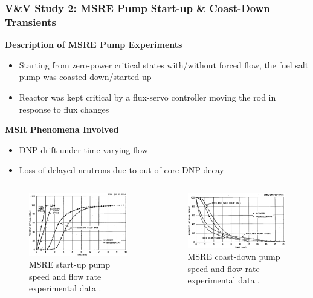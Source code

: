\begin{frame}
  \frametitle{V\&V Study 2: MSRE Pump Start-up \& Coast-Down Transients}
  \textbf{Description of MSRE Pump Experiments}
  \begin{itemize}
    \item Starting from zero-power critical states with/without forced flow, the fuel salt pump
  was coasted down/started up
    \item Reactor was kept critical by a flux-servo controller moving the rod in response to flux
      changes
  \end{itemize}
  \begin{block}{\textbf{MSR Phenomena Involved}}
    \begin{itemize}
      \item DNP drift under time-varying flow
      \item Loss of delayed neutrons due to out-of-core DNP decay
    \end{itemize}
  \end{block}
  \begin{columns}
    \column{5.5cm}
    \begin{figure}
      \centering
      \includegraphics[width=.8\columnwidth]{images/msre-startup}
      \caption{MSRE start-up pump speed and flow rate experimental data
      \cite{prince_zero-power_1968}.}
    \end{figure}
    \column{5.5cm}
    \begin{figure}
      \centering
      \includegraphics[width=.95\columnwidth]{images/msre-coastdown}
      \caption{MSRE coast-down pump speed and flow rate experimental data
      \cite{prince_zero-power_1968}.}
    \end{figure}
  \end{columns}
\end{frame}

